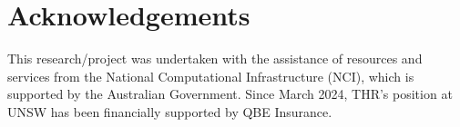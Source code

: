 \documentclass[alpha-refs]{wiley-article}
\begin{document}


\section*{Acknowledgements}
This research/project was undertaken with the assistance of resources and
services from the National Computational Infrastructure (NCI), which is
supported by the Australian Government. Since March 2024, THR's position at UNSW
has been financially supported by QBE Insurance.


\printendnotes

\end{document}
